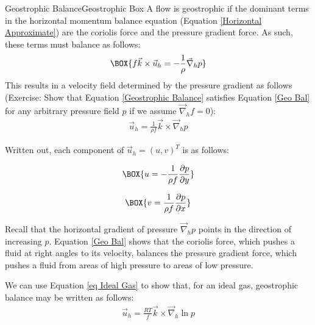 \begin{fact}{Geostrophic Balance}{Geostrophic Box}\label{Geostrophic Box}
    A flow is geostrophic if the dominant terms in the horizontal momentum balance equation (Equation \ref{Horizontal Approximate}) are the coriolis force and the pressure gradient force. As such, these terms must balance as follows:
    \begin{align}
        \label{Geo Bal}
        \BOX{f\vec{k}\times\vec{u}_h=-\frac{1}{\rho}\vec{\nabla}_hp}
    \end{align}
    This results in a velocity field determined by the pressure gradient as follows (Exercise: Show that Equation \ref{Geostrophic Balance} satisfies Equation \ref{Geo Bal} for any arbitrary pressure field \(p\) if we assume \(\vec{\nabla}_hf=0\)):
    \begin{align}\label{Geostrophic Balance}
        \boxed{\vec{u}_h=\frac{1}{\rho f}\vec{k}\times\vec{\nabla}_hp}
    \end{align}
\end{fact}

Written out, each component of \(\vec{u}_h=(u,v)^T\) is as follows:

\begin{minipage}{0.45\linewidth}
    \begin{align*}
        \BOX{u = -\frac{1}{\rho f}\frac{\partial p}{\partial y}}
    \end{align*}
\end{minipage}
\hfill
\begin{minipage}{0.45\linewidth}
    \begin{align*}
        \BOX{v = \frac{1}{\rho f}\frac{\partial p}{\partial x}}
    \end{align*}
\end{minipage}

\vspace{2 mm} Recall that the horizontal gradient of pressure \(\vec{\nabla}_h p\) points in the direction of increasing \(p\). Equation \ref{Geo Bal} shows that the coriolis force, which pushes a fluid at right angles to its velocity, balances the pressure gradient force, which pushes a fluid from areas of high pressure to areas of low pressure.

We can use Equation \ref{eq Ideal Gas} to show that, for an ideal gas, geostrophic balance may be written as follows:
\begin{align}
    \label{Geostrophic Ideal Gas}
    \vec{u}_h=\frac{RT}{ f}\vec{k}\times\vec{\nabla}_h\ln p
\end{align}

